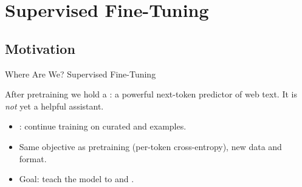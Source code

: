 
\section{Supervised Fine-Tuning}

\subsection{Motivation}

\begin{frame}{Where Are We? Supervised Fine-Tuning}

  \vspace{0.2em}
  After pretraining we hold a : a powerful next-token predictor of web text.
  It is \emph{not} yet a helpful assistant.
  \begin{itemize}[nosep]
    \item {}: continue training on curated
       and  examples.
    \item Same objective as pretraining (per-token cross-entropy), new data and format.
    \item Goal: teach the model to  and .
  \end{itemize}
\end{frame}

